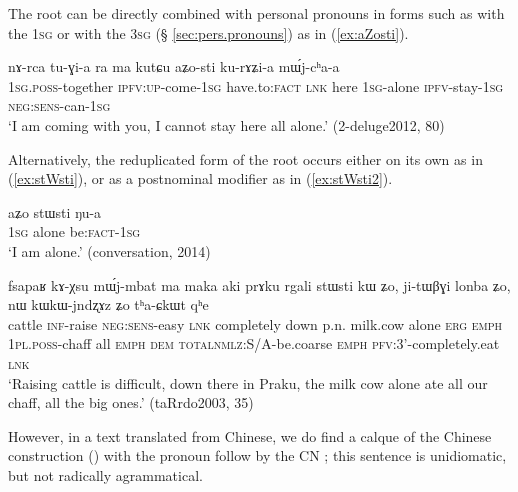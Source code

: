 The root  can be directly combined with personal pronouns in forms such as  with the \textsc{1sg}  or  with the \textsc{3sg}   (§ \ref{sec:pers.pronouns}) as in (\ref{ex:aZosti}).

\begin{exe}
\ex \label{ex:aZosti}
\gll   nɤ-rca tu-ɣi-a ra ma kutɕu aʑo-sti ku-rɤʑi-a mɯ́j-cʰa-a \\
 \textsc{1sg}.\textsc{poss}-together \textsc{ipfv}:\textsc{up}-come-\textsc{1sg} have.to:\textsc{fact} \textsc{lnk} here \textsc{1sg}-alone \textsc{ipfv}-stay-\textsc{1sg} \textsc{neg}:\textsc{sens}-can-\textsc{1sg} \\
\glt `I am coming with you, I cannot stay here all alone.' (2-deluge2012, 80)
\end{exe}

Alternatively, the reduplicated form of the root  occurs either on its own as in (\ref{ex:stWsti}), or as a postnominal modifier as in (\ref{ex:stWsti2}).

\begin{exe}
\ex \label{ex:stWsti}
\gll aʑo stɯsti ŋu-a \\
\textsc{1sg} alone be:\textsc{fact}-\textsc{1sg} \\
\glt `I am alone.' (conversation, 2014)
\end{exe}

\begin{exe}
\ex \label{ex:stWsti2}
\gll  fsapaʁ kɤ-χsu mɯ́j-mbat ma maka aki prɤku rgali stɯsti kɯ ʑo, ji-tɯβɣi lonba ʑo, nɯ kɯ\redp{}kɯ-jndʐɤz ʑo tʰa-ɕkɯt qʰe \\
cattle \textsc{inf}-raise \textsc{neg}:\textsc{sens}-easy \textsc{lnk} completely down p.n. milk.cow alone \textsc{erg} \textsc{emph} \textsc{1pl}.\textsc{poss}-chaff all \textsc{emph} \textsc{dem} \textsc{total}\redp{}\textsc{nmlz}:S/A-be.coarse \textsc{emph} \textsc{pfv}:3'-completely.eat \textsc{lnk} \\
\glt `Raising cattle is difficult, down there in Praku, the milk cow alone ate all our chaff, all the big ones.' (taRrdo2003, 35)
\end{exe}

However, in a text translated from Chinese, we do find a calque of the Chinese construction () with the pronoun  follow by the CN ; this sentence is unidiomatic, but not radically agrammatical.

